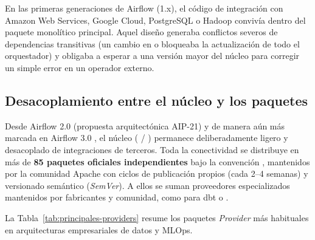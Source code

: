 En las primeras generaciones de Airflow (1.x), el código de integración con Amazon Web Services, Google Cloud, PostgreSQL o Hadoop convivía dentro del paquete monolítico principal. Aquel diseño generaba conflictos severos de dependencias transitivas (un cambio en  o  bloqueaba la actualización de todo el orquestador) y obligaba a esperar a una versión mayor del núcleo para corregir un simple error en un operador externo.

\subsection{Desacoplamiento entre el núcleo y los paquetes \texorpdfstring{}{apache-airflow-providers-*}}

Desde Airflow 2.0 (propuesta arquitectónica AIP-21) y de manera aún más marcada en Airflow 3.0 , el núcleo ( / ) permanece deliberadamente ligero y desacoplado de integraciones de terceros. Toda la conectividad se distribuye en más de \textbf{85 paquetes oficiales independientes} bajo la convención , mantenidos por la comunidad Apache con ciclos de publicación propios (cada 2--4 semanas) y versionado semántico (\textit{SemVer}). A ellos se suman proveedores especializados mantenidos por fabricantes y comunidad, como  para dbt o .

La Tabla~\ref{tab:principales-providers} resume los paquetes \textit{Provider} más habituales en arquitecturas empresariales de datos y MLOps.

